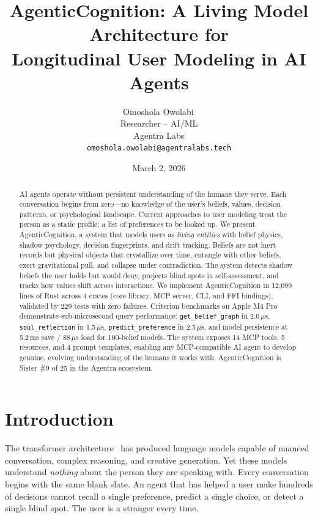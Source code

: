 \documentclass[10pt, twocolumn]{article}
\title{\textbf{AgenticCognition: A Living Model Architecture for\\Longitudinal User Modeling in AI Agents}}
\author{Omoshola Owolabi\,\orcidicon \\
  \small Researcher -- AI/ML \\
  \small Agentra Labs \\
  \small \texttt{omoshola.owolabi@agentralabs.tech}}
\date{March 2, 2026}
\begin{document}
\maketitle
\thispagestyle{fancy}

\begin{abstract}
AI agents operate without persistent understanding of the humans they serve. Each conversation begins from zero---no knowledge of the user's beliefs, values, decision patterns, or psychological landscape. Current approaches to user modeling treat the person as a static profile: a list of preferences to be looked up. We present AgenticCognition, a system that models users as \emph{living entities} with belief physics, shadow psychology, decision fingerprints, and drift tracking. Beliefs are not inert records but physical objects that crystallize over time, entangle with other beliefs, exert gravitational pull, and collapse under contradiction. The system detects shadow beliefs the user holds but would deny, projects blind spots in self-assessment, and tracks how values shift across interactions. We implement AgenticCognition in 12{,}099 lines of Rust across 4 crates (core library, MCP server, CLI, and FFI bindings), validated by 229 tests with zero failures. Criterion benchmarks on Apple M4 Pro demonstrate sub-microsecond query performance: \texttt{get\_belief\_graph} in 2.0\,$\mu$s, \texttt{soul\_reflection} in 1.5\,$\mu$s, \texttt{predict\_preference} in 2.5\,$\mu$s, and model persistence at 5.2\,ms save / 88\,$\mu$s load for 100-belief models. The system exposes 14 MCP tools, 5 resources, and 4 prompt templates, enabling any MCP-compatible AI agent to develop genuine, evolving understanding of the humans it works with. AgenticCognition is Sister \#9 of 25 in the Agentra ecosystem.
\end{abstract}

\section{Introduction}
\label{sec:intro}

The transformer architecture~\cite{vaswani2017attention} has produced language models capable of nuanced conversation, complex reasoning, and creative generation. Yet these models understand \emph{nothing} about the person they are speaking with. Every conversation begins with the same blank slate. An agent that has helped a user make hundreds of decisions cannot recall a single preference, predict a single choice, or detect a single blind spot. The user is a stranger every time.
\end{document}
